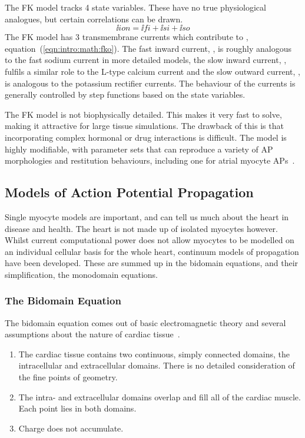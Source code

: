 The FK model tracks 4 state variables.
These have no true physiological analogues, but certain correlations can be
drawn.
\begin{equation}
\label{eqn:intro:math:fko}
\ii{ion} = \ii{fi} + \ii{si} + \ii{so}
\end{equation}
The FK model has 3 transmembrane currents which contribute to ,
equation~(\ref{eqn:intro:math:fko}).
The fast inward current, , is roughly analogous to the fast sodium
current in more detailed models, the slow inward current, , fulfils a
similar role to the L-type calcium current and the slow outward current, ,
is analogous to the potassium rectifier currents.
The behaviour of the currents is generally controlled by step functions based
on the state variables.

The FK model is not biophysically detailed.
This makes it very fast to solve, making it attractive for large tissue
simulations.
The drawback of this is that incorporating complex hormonal or drug interactions
is difficult.
The model is highly modifiable, with parameter sets that can reproduce a variety
of AP morphologies and restitution behaviours, including one for atrial myocyte
APs~\cite{Weber2008}.

\subsection{Models of Action Potential Propagation}

Single myocyte models are important, and can tell us much about the heart in
disease and health.
The heart is not made up of isolated myocytes however.
Whilst current computational power does not allow myocytes to be modelled on an
individual cellular basis for the whole heart, continuum models of propagation
have been developed.
These are summed up in the bidomain equations, and their simplification, the
monodomain equations.

\subsubsection{The Bidomain Equation}

The bidomain equation comes out of basic electromagnetic theory and several
assumptions about the nature of cardiac tissue~\cite{Tung1978,Geselowitz1983}.
\begin{enumerate}
    \item The cardiac tissue contains two continuous, simply connected domains, the intracellular and extracellular domains.
    There is no detailed consideration of the fine points of geometry.
    \item The intra- and extracellular domains overlap and fill all of the cardiac muscle. Each point lies in both domains.
    \item Charge does not accumulate.
\end{enumerate}

